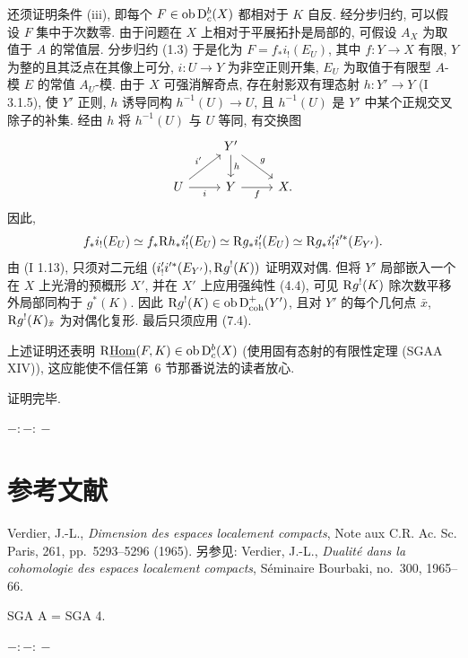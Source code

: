还须证明条件 (iii), 即每个 $F\in\operatorname{ob}\mathrm{D}_c^b(X)$ 都相对于 $K$ 自反. 经分步归约, 可以假设 $F$ 集中于次数零. 由于问题在 $X$ 上相对于平展拓扑是局部的, 可假设 $A_X$ 为取值于 $A$ 的常值层. 分步归约 (1.3) 于是化为 $F=f_*i_!(E_U)$, 其中 $f:Y\to X$ 有限, $Y$ 为整的且其泛点在其像上可分, $i:U\to Y$ 为非空正则开集, $E_U$ 为取值于有限型 $A$-模 $E$ 的常值 $A_U$-模. 由于 $X$ 可强消解奇点, 存在射影双有理态射 $h:Y'\to Y$ (I 3.1.5), 使 $Y'$ 正则, $h$ 诱导同构 $h^{-1}(U)\to U$, 且 $h^{-1}(U)$ 是 $Y'$ 中某个正规交叉除子的补集. 经由 $h$ 将 $h^{-1}(U)$ 与 $U$ 等同, 有交换图
\[
\begin{tikzcd}
& Y' \arrow[d,"h"] \arrow[dr,"g"] & \\
U \arrow[ur,"i'"] \arrow[r,"i"'] & Y \arrow[r,"f"'] & X.
\end{tikzcd}
\]
因此,
\[
        f_*i_!(E_U)\simeq f_*\mathrm R h_* i'_!(E_U)\simeq \mathrm R g_* i'_!(E_U)\simeq \mathrm R g_* i'_! i'^*(E_{Y'}).
\]
由 (I 1.13), 只须对二元组 $(i'_!i'^*(E_{Y'}),\mathrm R g^!(K))$ 证明双对偶. 但将 $Y'$ 局部嵌入一个在 $X$ 上光滑的预概形 $X'$, 并在 $X'$ 上应用强纯性 (4.4), 可见 $\mathrm R g^!(K)$ 除次数平移外局部同构于 $g^*(K)$. 因此 $\mathrm R g^!(K)\in\operatorname{ob}\mathrm{D}^{+}_{\mathrm{coh}}(Y')$, 且对 $Y'$ 的每个几何点 $\bar{x}$, $\mathrm R g^!(K)_{\bar{x}}$ 为对偶化复形. 最后只须应用 (7.4).

上述证明还表明 $\mathrm R\underline{\operatorname{Hom}}(F,K)\in\operatorname{ob}\mathrm{D}_c^b(X)$ (使用固有态射的有限性定理 (SGAA XIV)), 这应能使不信任第~6 节那番说法的读者放心.

证明完毕.

\begin{center}
$-:\!-:\!-$
\end{center}

\section*{参考文献}

\begin{enumerate}[label={[\arabic*]}]
\item Verdier, J.-L., \emph{Dimension des espaces localement compacts}, Note aux C.R. Ac. Sc. Paris, 261, pp.~5293--5296 (1965). 另参见: Verdier, J.-L., \emph{Dualité dans la cohomologie des espaces localement compacts}, Séminaire Bourbaki, no.~300, 1965--66.
\end{enumerate}

SGA A = SGA 4.

\begin{center}
$-:\!-:\!-$
\end{center}

